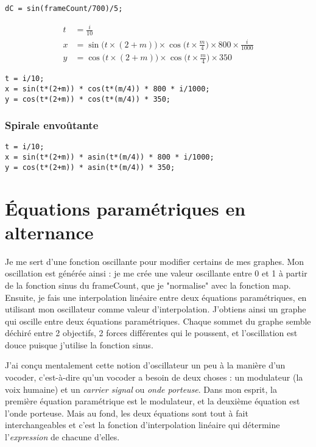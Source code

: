 \begin{lstlisting}
dC = sin(frameCount/700)/5;
\end{lstlisting}

\begin{align*}
t &= \frac{i}{10}\\
x &= \sin\big(t\times(2+m)\big) \times \cos\bigg(t\times\frac{m}{4}\bigg) \times 800 \times \frac{i}{1000}\\
y &= \cos\big(t\times(2+m)\big) \times \cos\bigg(t\times\frac{m}{4}\bigg) \times 350
\end{align*}

\begin{lstlisting}
t = i/10;
x = sin(t*(2+m)) * cos(t*(m/4)) * 800 * i/1000;
y = cos(t*(2+m)) * cos(t*(m/4)) * 350;
\end{lstlisting}

\subsubsection{Spirale envoûtante}

\begin{lstlisting}
t = i/10;
x = sin(t*(2+m)) * asin(t*(m/4)) * 800 * i/1000;
y = cos(t*(2+m)) * asin(t*(m/4)) * 350;
\end{lstlisting}

\section{Équations paramétriques en alternance}
Je me sert d'une fonction oscillante pour modifier certains de mes graphes. Mon oscillation est générée ainsi : je me crée une valeur oscillante entre 0 et 1 à partir de la fonction sinus du frameCount, que je "normalise" avec la fonction map. Ensuite, je fais une interpolation linéaire entre deux équations paramétriques, en utilisant mon oscillateur comme valeur d'interpolation. J'obtiens ainsi un graphe qui oscille entre deux équations paramétriques. Chaque sommet du graphe semble déchiré entre 2 objectifs, 2 forces différentes qui le poussent, et l'oscillation est douce puisque j'utilise la fonction sinus.

J'ai conçu mentalement cette notion d'oscillateur un peu à la manière d'un vocoder, c'est-à-dire qu'un vocoder a besoin de deux choses : un modulateur (la voix humaine) et un \textit{carrier signal} ou \textit{onde porteuse}. Dans mon esprit, la première équation paramétrique est le modulateur, et la deuxième équation est l'onde porteuse. Mais au fond, les deux équations sont tout à fait interchangeables et c'est la fonction d'interpolation linéaire qui détermine l'\textit{expression} de chacune d'elles.

